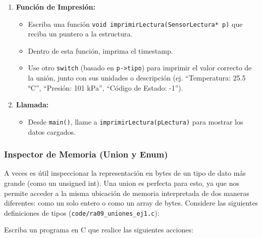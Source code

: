 \begin{enumerate}
    \item \textbf{Función de Impresión:}
    \begin{itemize}
        \item Escriba una función \texttt{void imprimirLectura(SensorLectura* p)} que reciba un puntero a la estructura.
        \item Dentro de esta función, imprima el timestamp.
        \item Use otro \texttt{switch} (basado en \texttt{p->tipo}) para imprimir el valor correcto de la unión, junto con sus unidades o descripción (ej. ``Temperatura: 25.5 °C'', ``Presión: 101 kPa'', ``Código de Estado: -1'').
    \end{itemize}

    \item \textbf{Llamada:}
    \begin{itemize}
        \item Desde \texttt{main()}, llame a \texttt{imprimirLectura(pLectura)} para mostrar los datos cargados.
    \end{itemize}
\end{enumerate}

\subsubsection*{Inspector de Memoria (Union y Enum)}
A veces es útil inspeccionar la representación en bytes de un tipo de dato más grande (como un unsigned int). Una union es perfecta para esto, ya que nos permite acceder a la misma ubicación de memoria interpretada de dos maneras diferentes: como un solo entero o como un array de bytes.
Considere las siguientes definiciones de tipos (\texttt{code/ra09\_uniones\_ej1.c}):

\lstset{inputencoding=utf8/latin1}


Escriba un programa en C que realice las siguientes acciones:

